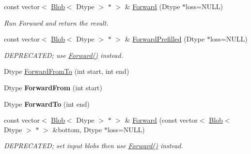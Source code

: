 \begin{DoxyCompactItemize}
\mbox{\label{classcaffe_1_1_net_afe59477d530c9f9cfb6ca00e92af4664}} 
const vector$<$ \mbox{\hyperlink{classcaffe_1_1_blob}{Blob}}$<$ Dtype $>$ $\ast$ $>$ \& \mbox{\hyperlink{classcaffe_1_1_net_afe59477d530c9f9cfb6ca00e92af4664}{Forward}} (Dtype $\ast$loss=N\+U\+LL)
\begin{DoxyCompactList}\small\item\em Run Forward and return the result. \end{DoxyCompactList}\item 
\mbox{\label{classcaffe_1_1_net_a12f8c6cf9f453cdbc9fa8149986303c6}} 
const vector$<$ \mbox{\hyperlink{classcaffe_1_1_blob}{Blob}}$<$ Dtype $>$ $\ast$ $>$ \& \mbox{\hyperlink{classcaffe_1_1_net_a12f8c6cf9f453cdbc9fa8149986303c6}{Forward\+Prefilled}} (Dtype $\ast$loss=N\+U\+LL)
\begin{DoxyCompactList}\small\item\em D\+E\+P\+R\+E\+C\+A\+T\+ED; use \mbox{\hyperlink{classcaffe_1_1_net_a6f6cf9d40637f7576828d856bb1b1826}{Forward()}} instead. \end{DoxyCompactList}\item 
Dtype \mbox{\hyperlink{classcaffe_1_1_net_ae5354c03371d4cb7b18988561790e676}{Forward\+From\+To}} (int start, int end)
\item 
\mbox{\label{classcaffe_1_1_net_a7da4abdebcea6a65ca61ef6afb61665f}} 
Dtype {\bfseries Forward\+From} (int start)
\item 
\mbox{\label{classcaffe_1_1_net_a9e78782abd9080626ad13daac3abf896}} 
Dtype {\bfseries Forward\+To} (int end)
\item 
\mbox{\label{classcaffe_1_1_net_ac78806e7aa069439622de4177323c46c}} 
const vector$<$ \mbox{\hyperlink{classcaffe_1_1_blob}{Blob}}$<$ Dtype $>$ $\ast$ $>$ \& \mbox{\hyperlink{classcaffe_1_1_net_ac78806e7aa069439622de4177323c46c}{Forward}} (const vector$<$ \mbox{\hyperlink{classcaffe_1_1_blob}{Blob}}$<$ Dtype $>$ $\ast$ $>$ \&bottom, Dtype $\ast$loss=N\+U\+LL)
\begin{DoxyCompactList}\small\item\em D\+E\+P\+R\+E\+C\+A\+T\+ED; set input blobs then use \mbox{\hyperlink{classcaffe_1_1_net_a6f6cf9d40637f7576828d856bb1b1826}{Forward()}} instead. \end{DoxyCompactList}\item 

\end{DoxyCompactItemize}
